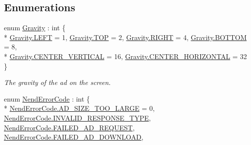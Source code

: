 \subsection*{Enumerations}
\begin{DoxyCompactItemize}
\item 
enum \hyperlink{namespace_nend_unity_plugin_1_1_common_a8aa5efc54dabd2a35e51892bec9e28d6}{Gravity} \+: int \{ \\*
\hyperlink{namespace_nend_unity_plugin_1_1_common_a8aa5efc54dabd2a35e51892bec9e28d6a684d325a7303f52e64011467ff5c5758}{Gravity.\+L\+E\+F\+T} = 1, 
\hyperlink{namespace_nend_unity_plugin_1_1_common_a8aa5efc54dabd2a35e51892bec9e28d6a6705777b712ee811e76fb07162081d63}{Gravity.\+T\+O\+P} = 2, 
\hyperlink{namespace_nend_unity_plugin_1_1_common_a8aa5efc54dabd2a35e51892bec9e28d6a21507b40c80068eda19865706fdc2403}{Gravity.\+R\+I\+G\+H\+T} = 4, 
\hyperlink{namespace_nend_unity_plugin_1_1_common_a8aa5efc54dabd2a35e51892bec9e28d6a1fabf63de5c96c78e2a40805bcdeb73b}{Gravity.\+B\+O\+T\+T\+O\+M} = 8, 
\\*
\hyperlink{namespace_nend_unity_plugin_1_1_common_a8aa5efc54dabd2a35e51892bec9e28d6a2cc924691e026a785a32f6843aeb8fba}{Gravity.\+C\+E\+N\+T\+E\+R\+\_\+\+V\+E\+R\+T\+I\+C\+A\+L} = 16, 
\hyperlink{namespace_nend_unity_plugin_1_1_common_a8aa5efc54dabd2a35e51892bec9e28d6a8e0df4c9801cd8a497c6763895aeb1ab}{Gravity.\+C\+E\+N\+T\+E\+R\+\_\+\+H\+O\+R\+I\+Z\+O\+N\+T\+A\+L} = 32
 \}
\begin{DoxyCompactList}\small\item\em The gravity of the ad on the screen. \end{DoxyCompactList}\item 
enum \hyperlink{namespace_nend_unity_plugin_1_1_common_a9bcb251827acb8ae5f3a35fc9de7195e}{Nend\+Error\+Code} \+: int \{ \\*
\hyperlink{namespace_nend_unity_plugin_1_1_common_a9bcb251827acb8ae5f3a35fc9de7195eafde588e0fa71c14475fae982e559d2b1}{Nend\+Error\+Code.\+A\+D\+\_\+\+S\+I\+Z\+E\+\_\+\+T\+O\+O\+\_\+\+L\+A\+R\+G\+E} = 0, 
\hyperlink{namespace_nend_unity_plugin_1_1_common_a9bcb251827acb8ae5f3a35fc9de7195ea8f6575bd42a0331283412beeb9ac0895}{Nend\+Error\+Code.\+I\+N\+V\+A\+L\+I\+D\+\_\+\+R\+E\+S\+P\+O\+N\+S\+E\+\_\+\+T\+Y\+P\+E}, 
\hyperlink{namespace_nend_unity_plugin_1_1_common_a9bcb251827acb8ae5f3a35fc9de7195ea97dcd033dc8770f9cc8762aede775308}{Nend\+Error\+Code.\+F\+A\+I\+L\+E\+D\+\_\+\+A\+D\+\_\+\+R\+E\+Q\+U\+E\+S\+T}, 
\hyperlink{namespace_nend_unity_plugin_1_1_common_a9bcb251827acb8ae5f3a35fc9de7195ead2916b89cc7b34cd48b603e339016ec9}{Nend\+Error\+Code.\+F\+A\+I\+L\+E\+D\+\_\+\+A\+D\+\_\+\+D\+O\+W\+N\+L\+O\+A\+D}, 

\end{DoxyCompactItemize}
